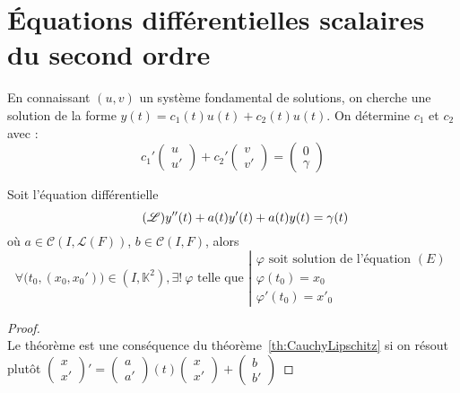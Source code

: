 \documentclass[11pt,a4paper,fleqn,pdftex]{report}
\begin{document}
\section{Équations différentielles scalaires du second ordre} %
\label{sec:equations_differentielles_scalaires_du_second_ordre}
\begin{itheorem}
    En connaissant $(u,v)$ un système fondamental de solutions, on cherche une solution de la forme $y(t) = c_1(t) u(t) + c_2(t) u(t)$. On détermine $c_1$ et $c_2$ avec :
    \begin{equation}
    c_1'\begin{pmatrix} u \\ u' \end{pmatrix} + c_2'\begin{pmatrix} v \\ v' \end{pmatrix} = \begin{pmatrix} 0 \\ \gamma \end{pmatrix}
    \end{equation}
\end{itheorem}
\begin{itheorem}
Soit l'équation différentielle 
\begin{equation}\tag{$\mathscr{L}$}
    y''(t) + a(t) y'(t) + a(t)y(t)= \gamma (t)
\end{equation}
où $a \in \mathcal{C}\left( I,\mathscr{L}(F)\right)$, $b\in \mathcal{C}(I,F)$, alors
\[
    \forall \big( t_0,(x_0,x_0') \big) \in (I,\mathbb{K}^2), \exists ! \: \varphi \text{ telle que }
    \left|
    \begin{array}{l}
        \varphi \text{ soit solution de l'équation }(E)\\
        \varphi(t_0)=x_0 \\
        \varphi'(t_0) = x'_0
    \end{array}
    \right.
\]
\end{itheorem}
\begin{proof} \hfill \\
    Le théorème est une conséquence du théorème~\ref{th:CauchyLipschitz} si on résout plutôt $\begin{pmatrix} x \\ x' \end{pmatrix}' = \begin{pmatrix} a \\ a' \end{pmatrix}(t)\begin{pmatrix} x \\ x' \end{pmatrix} + \begin{pmatrix} b \\ b' \end{pmatrix}$ 
\end{proof}
\end{document}
